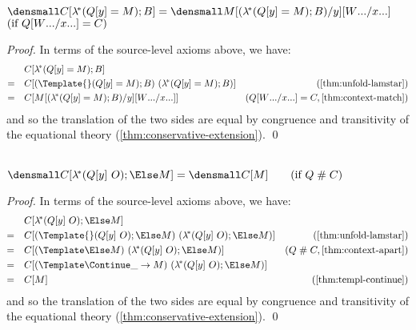 \begin{lemma}
  \label{thm:context-lamstar-match}
  \\
  $\den{C[\lamstar (Q[y] = M); B]} = \den{M\subst{y}{(\lamstar (Q[y] = M); B)}\subst{\many{x}}{\many{W}}}$
  \\
  $(\text{if } Q\subst{\many{x}}{\many{W}} = C)$
\end{lemma}
\begin{proof}
  In terms of the source-level axioms above, we have:
  \begin{align*}
    &\quad
    C[\lamstar (Q[y] = M); B]
    \\
    =&\quad
    C[(\Template{} (Q[y] = M); B)~(\lamstar (Q[y]=M); B)]
    &(\cref{thm:unfold-lamstar})
    \\
    =&\quad
    C[M\subst{y}{(\lamstar (Q[y]=M); B)}\subst{\many{x}}{\many{W}}]
    &(Q\subst{\many{x}}{\many{W}} = C, \cref{thm:context-match})
  \end{align*}
  and so the translation of the two sides are equal by congruence and transitivity of the equational theory (\cref{thm:conservative-extension}).
  \qed
\end{proof}

\begin{lemma}
  \label{thm:context-lamstar-apart}
  \\
  $\den{C[\lamstar (Q[y] ~ O); \Else M]} = \den{C[M]}
  \qquad (\text{if } Q \apart C)$
\end{lemma}
\begin{proof}
  In terms of the source-level axioms above, we have:
  \begin{align*}
    &\quad
    C[\lamstar (Q[y] ~ O); \Else M]
    \\
    =&\quad
    C[(\Template{} (Q[y] ~ O); \Else M) ~ (\lamstar (Q[y] ~ O); \Else M)]
    &(\cref{thm:unfold-lamstar})
    \\
    =&\quad
    C[(\Template \Else M) ~ (\lamstar (Q[y] ~ O); \Else M)]
    &(Q \apart C, \cref{thm:context-apart})
    \\
    =&\quad
    C[(\Template \Continue \_ \to M) ~ (\lamstar (Q[y] ~ O); \Else M)]
    \\
    =&\quad
    C[M]
    &(\cref{thm:templ-continue})
  \end{align*}
  and so the translation of the two sides are equal by congruence and transitivity of the equational theory (\cref{thm:conservative-extension}).
  \qed
\end{proof}

